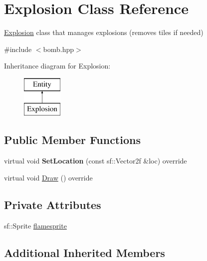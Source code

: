 \hypertarget{class_explosion}{}\section{Explosion Class Reference}
\label{class_explosion}


\mbox{\hyperlink{class_explosion}{Explosion}} class that manages explosions (removes tiles if needed)  




{\ttfamily \#include $<$bomb.\+hpp$>$}

Inheritance diagram for Explosion\+:\begin{figure}[H]
\begin{center}
\leavevmode
\includegraphics[height=2.000000cm]{class_explosion}
\end{center}
\end{figure}
\subsection*{Public Member Functions}
\begin{DoxyCompactItemize}
\item 
\mbox{\label{class_explosion_afe05bbec6286d9a5bc994f1ee7fd6aa4}} 
virtual void {\bfseries Set\+Location} (const sf\+::\+Vector2f \&loc) override
\item 
virtual void \mbox{\hyperlink{class_explosion_a7c63ca80a8b15f581302be57342ce329}{Draw}} () override
\end{DoxyCompactItemize}
\subsection*{Private Attributes}
\begin{DoxyCompactItemize}
\item 
sf\+::\+Sprite \mbox{\hyperlink{class_explosion_ae32b96888c43e2a1adfb61c3b6baa2a4}{flamesprite}}
\end{DoxyCompactItemize}
\subsection*{Additional Inherited Members}


